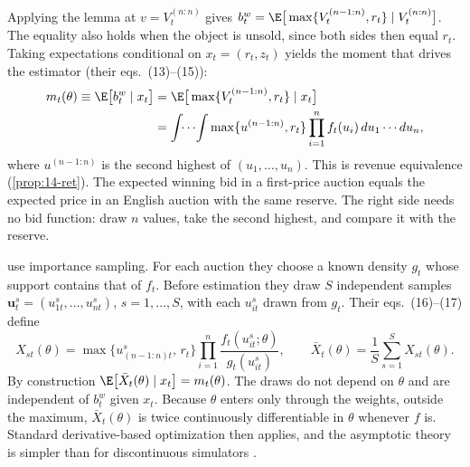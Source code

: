 Applying the lemma at $v=V_t^{(n:n)}$ gives $b^w_t=\E\big[\max\{V_t^{(n-1:n)},r_t\}\mid V_t^{(n:n)}\big]$. The equality
also holds when the object is unsold, since both sides then equal $r_t$. Taking expectations conditional on
$x_t=(r_t,z_t)$ yields the moment that drives the estimator (their eqs.~(13)--(15)):
\begin{equation}\label{eq:15-lov-mean}
\begin{aligned}
m_t(\theta)\equiv\E\big[b^w_t\mid x_t\big]&=\E\big[\max\{V_t^{(n-1:n)},r_t\}\mid x_t\big]\\
&=\int\!\!\cdots\!\int\max\{u^{(n-1:n)},r_t\}\prod_{i=1}^nf_t(u_i)\,du_1\cdots du_n ,
\end{aligned}
\end{equation}
where $u^{(n-1:n)}$ is the second highest of $(u_1,\dots,u_n)$. This is revenue equivalence (\cref{prop:14-ret}). The
expected winning bid in a first-price auction equals the expected price in an English auction with the same reserve.
The right side needs no bid function: draw $n$ values, take the second highest, and compare it with the reserve.

\citet{LaffontOssardVuong1995} use importance sampling. For each auction they choose a known density $g_t$ whose
support contains that of $f_t$. Before estimation they draw $S$ independent samples
$\bm u_t^s=(u^s_{1t},\dots,u^s_{nt})$, $s=1,\dots,S$, with each $u^s_{it}$ drawn from $g_t$. Their eqs.~(16)--(17) define
\[
X_{st}(\theta)=\max\big\{u^{s}_{(n-1:n)t},\,r_t\big\}\prod_{i=1}^n\frac{f_t(u^s_{it};\theta)}{g_t(u^s_{it})},
\qquad\bar X_t(\theta)=\frac1S\sum_{s=1}^SX_{st}(\theta).
\]
By construction $\E\big[\bar X_t(\theta)\mid x_t\big]=m_t(\theta)$. The draws do not depend on $\theta$ and are independent of
$b^w_t$ given $x_t$. Because $\theta$ enters only through the weights, outside the maximum, $\bar X_t(\theta)$ is twice
continuously differentiable in $\theta$ whenever $f$ is. Standard derivative-based optimization then applies, and the
asymptotic theory is simpler than for discontinuous simulators \citep[p.~961]{LaffontOssardVuong1995}.


